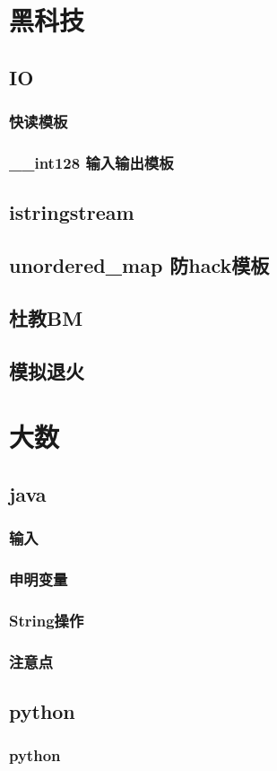 \documentclass[10pt,a4paper]{article}
\begin{document}
\section{黑科技}
\subsection{IO}
\subsubsection{快读模板}

\subsubsection{\_\_int128 输入输出模板}

\subsection{istringstream}

\subsection{unordered\_map 防hack模板}

\subsection{杜教BM}

\subsection{模拟退火}

\section{大数}
\subsection{java}
\subsubsection{输入}

\subsubsection{申明变量}

\subsubsection{String操作}

\subsubsection{注意点}

\subsection{python}
\subsubsection{python}

\end{document}
